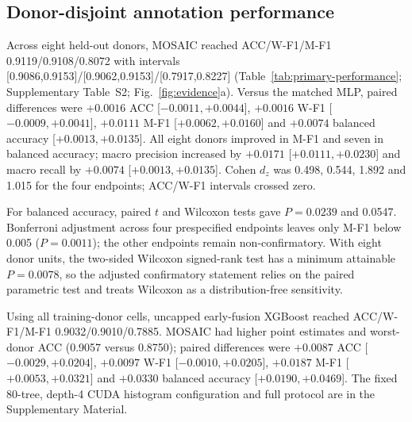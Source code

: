\documentclass[unnumsec,webpdf,contemporary,large,numbered]{oup-authoring-template}
\begin{document}
\subsection{Donor-disjoint annotation performance}

Across eight held-out donors, MOSAIC reached ACC/W-F1/M-F1 0.9119/0.9108/0.8072 with intervals [0.9086,0.9153]/[0.9062,0.9153]/[0.7917,0.8227] (Table~\ref{tab:primary-performance}; Supplementary Table~S2; Fig.~\ref{fig:evidence}a). Versus the matched MLP, paired differences were $+0.0016$ ACC [$-0.0011,+0.0044$], $+0.0016$ W-F1 [$-0.0009,+0.0041$], $+0.0111$ M-F1 [$+0.0062,+0.0160$] and $+0.0074$ balanced accuracy [$+0.0013,+0.0135$]. All eight donors improved in M-F1 and seven in balanced accuracy; macro precision increased by $+0.0171$ [$+0.0111,+0.0230$] and macro recall by $+0.0074$ [$+0.0013,+0.0135$]. Cohen $d_z$ was 0.498, 0.544, 1.892 and 1.015 for the four endpoints; ACC/W-F1 intervals crossed zero.

For balanced accuracy, paired $t$ and Wilcoxon tests gave $P=0.0239$ and 0.0547. Bonferroni adjustment across four prespecified endpoints leaves only M-F1 below 0.005 ($P=0.0011$); the other endpoints remain non-confirmatory. With eight donor units, the two-sided Wilcoxon signed-rank test has a minimum attainable $P=0.0078$, so the adjusted confirmatory statement relies on the paired parametric test and treats Wilcoxon as a distribution-free sensitivity.

\begin{table}[t]
\centering
\caption{Primary nested donor-disjoint PBMC L3 performance. Values are donor means with two-sided 95\% Student-$t$ intervals after seed averaging; worst/best are donor point estimates. The two MLP rows use matched loss and selection, with the second a 2,467,706-parameter capacity control. CellTypist rows distinguish full-transcriptome-denominator CP10K from subset-first sensitivity.}
\label{tab:primary-performance}
\scriptsize
\setlength{\tabcolsep}{2.8pt}
\resizebox{\textwidth}{!}{%

}
\end{table}

Using all training-donor cells, uncapped early-fusion XGBoost reached ACC/W-F1/M-F1 0.9032/0.9010/0.7885. MOSAIC had higher point estimates and worst-donor ACC (0.9057 versus 0.8750); paired differences were $+0.0087$ ACC [$-0.0029,+0.0204$], $+0.0097$ W-F1 [$-0.0010,+0.0205$], $+0.0187$ M-F1 [$+0.0053,+0.0321$] and $+0.0330$ balanced accuracy [$+0.0190,+0.0469$]. The fixed 80-tree, depth-4 CUDA histogram configuration and full protocol are in the Supplementary Material.
\end{document}

